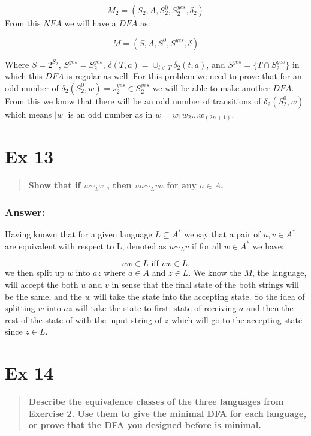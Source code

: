 \documentclass[titlepage]{article}\usepackage[]{graphicx}\usepackage[]{color}
\begin{document}
\[ 
  M_2 = (S_2, A, S^0_2, S^{yes}_2, \delta_2)
\]
From this $NFA$ we will have a $DFA$ as:

\[ 
  M = (S, A, S^0, S^{yes}, \delta)
\]

Where $S = 2^{S_2}$, $S^{yes} = {S^{yes}_2}$, $\delta(T, a) = \cup_{t\in T} \delta_2(t, a)$, and $S^{yes} = \{T\cap S^{yes}_2\}$ in which this $DFA$ is regular as well. For this problem we need to prove that for an odd number of  $\delta_2(S^0_2, w) = s^{yes}_2 \in S^{yes}_2$ we will be able to make another $DFA$. From this we know that there will be an odd number of transitions of $\delta_2(S^0_2, w)$ which means $|w|$ is an odd number as in $w=w_1w_2...w_(2n+1)$.
\vspace{1cm}



\section*{Ex 13}
\begin{quote}
  \textbf{Show that if $u \sim_L v$ , then $ua \sim_L va$ for any $a \in A$.}
\end{quote}

\subsubsection*{Answer:}
Having known that for a given language $L \subseteq A^* $ we say that a pair of $u, v \in A^*$ are equivalent with respect to L, denoted as $u \sim_L v$ if for all $w \in A^*$ we have:

\[
	uw \in L \text{ iff } vw \in L.
\]
we then split up $w$ into $az$ where $a \in A$ and $z \in L$. We know the $M$, the language, will accept the both $u$ and $v$ in sense that the final state of the both strings will be the same, and the $w$ will take the state into the accepting state. So the idea of splitting $w$ into $az$ will take the state to first: state of receiving $a$ and then the rest of the state of with the input string of $z$ which will go to the accepting state since $z \in L$.
\vspace{1cm}



\section*{Ex 14}
\begin{quote}
  \textbf{Describe the equivalence classes of the three languages from Exercise
  2. Use them to give the minimal DFA for each language, or prove that the DFA
  you designed before is minimal.}
\end{quote}
\end{document}
